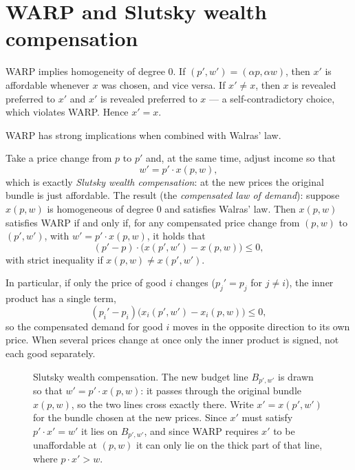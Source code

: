 \documentclass[11pt]{article}
\begin{document}
\section{WARP and Slutsky wealth compensation}

WARP implies homogeneity of degree 0. If $(p',w')=(\alpha p,\alpha w)$, then $x'$
is affordable whenever $x$ was chosen, and vice versa. If $x'\ne x$, then $x$ is
revealed preferred to $x'$ and $x'$ is revealed preferred to $x$ --- a
self-contradictory choice, which violates WARP. Hence $x'=x$.

WARP has strong implications when combined with Walras' law.

Take a price change from $p$ to $p'$ and, at the same time, adjust income so that
\[ w'=p'\cdot x(p,w), \]
which is exactly \emph{Slutsky wealth compensation}: at the new prices the original
bundle is just affordable. The result (the \emph{compensated law of demand}): suppose $x(p,w)$ is homogeneous
of degree 0 and satisfies Walras' law. Then $x(p,w)$ satisfies WARP if and only if,
for any compensated price change from $(p,w)$ to $(p',w')$, with
$w'=p'\cdot x(p,w)$, it holds that
\[ (p'-p)\cdot\bigl(x(p',w')-x(p,w)\bigr)\le 0, \]
with strict inequality if $x(p,w)\ne x(p',w')$.

In particular, if only the price of good $i$ changes ($p_j'=p_j$ for $j\ne i$), the
inner product has a single term,
\[ (p_i'-p_i)\bigl(x_i(p',w')-x_i(p,w)\bigr)\le 0, \]
so the compensated demand for good $i$ moves in the opposite direction to its own
price. When several prices change at once only the inner product is signed, not each
good separately.

\begin{figure}[ht]
\centering
{}
\caption{Slutsky wealth compensation. The new budget line $B_{p',w'}$ is drawn so
that $w'=p'\cdot x(p,w)$: it passes through the original bundle $x(p,w)$, so the two
lines cross exactly there. Write $x'=x(p',w')$ for the bundle chosen at the new
prices. Since $x'$ must satisfy $p'\cdot x'=w'$ it lies on $B_{p',w'}$, and since
WARP requires $x'$ to be unaffordable at $(p,w)$ it can only lie on the thick part
of that line, where $p\cdot x'>w$.}
\end{figure}
\end{document}
